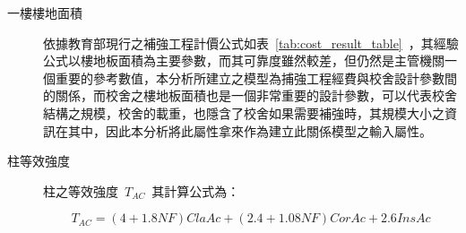 \begin{description}
  \item[一樓樓地面積]
  依據教育部現行之補強工程計價公式如表~\ref{tab:cost_result_table}~，其經驗公式以樓地板面積為主要參數，而其可靠度雖然較差，但仍然是主管機關一個重要的參考數值，本分析所建立之模型為捕強工程經費與校舍設計參數間的關係，而校舍之樓地板面積也是一個非常重要的設計參數，可以代表校舍結構之規模，校舍的載重，也隱含了校舍如果需要補強時，其規模大小之資訊在其中，因此本分析將此屬性拿來作為建立此關係模型之輸入屬性。
  \item[柱等效強度]
  柱之等效強度~$T_{AC}$~其計算公式為：

  \begin{equation}T_{AC} = (4+1.8NF)ClaAc+(2.4+1.08NF)CorAc+2.6InsAc\end{equation} 


\end{description}
